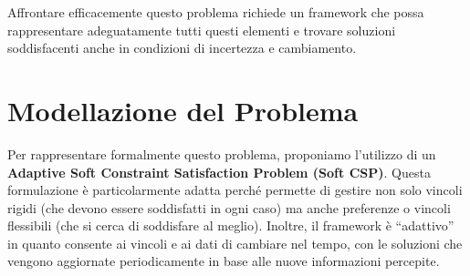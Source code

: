 \documentclass[letterpaper]{article}
\begin{document}
Affrontare efficacemente questo problema richiede un framework che possa rappresentare adeguatamente tutti questi elementi e trovare soluzioni soddisfacenti anche in condizioni di incertezza e cambiamento.

\section{Modellazione del Problema}
Per rappresentare formalmente questo problema, proponiamo l'utilizzo di un \textbf{Adaptive Soft Constraint Satisfaction Problem (Soft CSP)}. Questa formulazione è particolarmente adatta perché permette di gestire non solo vincoli rigidi (che devono essere soddisfatti in ogni caso) ma anche preferenze o vincoli flessibili (che si cerca di soddisfare al meglio). Inoltre, il framework è ``adattivo'' in quanto consente ai vincoli e ai dati di cambiare nel tempo, con le soluzioni che vengono aggiornate periodicamente in base alle nuove informazioni percepite.
\end{document}
